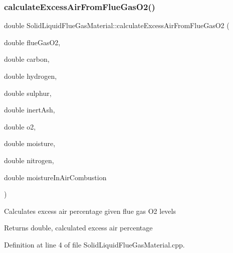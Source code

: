 \subsubsection{\texorpdfstring{calculate\+Excess\+Air\+From\+Flue\+Gas\+O2()}{calculateExcessAirFromFlueGasO2()}\hspace{0.1cm}{\footnotesize\ttfamily [1/3]}}
{\footnotesize\ttfamily double Solid\+Liquid\+Flue\+Gas\+Material\+::calculate\+Excess\+Air\+From\+Flue\+Gas\+O2 (\begin{DoxyParamCaption}\item[{double}]{flue\+Gas\+O2,  }\item[{double}]{carbon,  }\item[{double}]{hydrogen,  }\item[{double}]{sulphur,  }\item[{double}]{inert\+Ash,  }\item[{double}]{o2,  }\item[{double}]{moisture,  }\item[{double}]{nitrogen,  }\item[{double}]{moisture\+In\+Air\+Combustion }\end{DoxyParamCaption})\hspace{0.3cm}{\ttfamily [static]}}

Calculates excess air percentage given flue gas O2 levels \begin{DoxyReturn}{Returns}
double, calculated excess air percentage 
\end{DoxyReturn}


Definition at line 4 of file Solid\+Liquid\+Flue\+Gas\+Material.\+cpp.

\mbox{\label{class_solid_liquid_flue_gas_material_abecacec1d6f108a8cdf002a9f67972c7}} 
